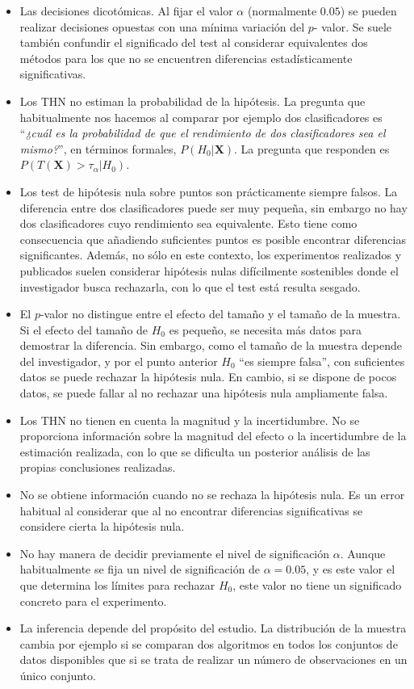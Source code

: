 \begin{itemize}
\item Las decisiones dicotómicas. Al fijar el valor 
	$\alpha$ (normalmente $0.05$) se pueden realizar 
	decisiones opuestas con una mínima variación del $p$-
	valor. Se suele también confundir el significado del 
	test al considerar equivalentes dos métodos para los que
	no se encuentren diferencias estadísticamente 
	significativas.
\item Los THN no estiman la probabilidad
	de la hipótesis. La pregunta que habitualmente nos
	hacemos al comparar por ejemplo dos clasificadores es
	``\textit{¿cuál es la probabilidad de que el rendimiento
	de dos clasificadores sea el mismo?}'', en términos
	formales, $P(H_0 | \mathbf{X})$. La pregunta que
	responden es $P(T(\mathbf{X}) > \tau_\alpha | H_0)$.
\item Los test de hipótesis nula sobre puntos son
	prácticamente siempre falsos. La diferencia entre
	dos clasificadores puede ser muy pequeña, sin embargo
	no hay dos clasificadores cuyo rendimiento sea 
	equivalente. Esto tiene como consecuencia que añadiendo
	suficientes puntos es posible encontrar diferencias
	significantes. Además, no sólo en este contexto, los
	experimentos realizados y publicados suelen considerar
	hipótesis nulas difícilmente sostenibles donde el
	investigador busca rechazarla, con lo que el test está
	resulta sesgado.
\item El $p$-valor no distingue entre el efecto del tamaño
	y el tamaño de la muestra. Si el efecto del tamaño de
	$H_0$ es pequeño, se necesita más datos para demostrar 
	la diferencia. Sin embargo, como el tamaño de la muestra
	depende del investigador, y por el punto anterior $H_0$ 
	``es siempre falsa'', con suficientes datos se puede
	rechazar la hipótesis nula. En cambio, si se dispone 
	de pocos datos, se puede fallar al no rechazar una
	hipótesis nula ampliamente falsa.
\item Los THN no tienen en cuenta la magnitud y la 
	incertidumbre. No se proporciona información sobre la 
	magnitud del efecto o la incertidumbre de la estimación
	realizada, con lo que se dificulta un posterior análisis
	de las propias conclusiones realizadas.
\item No se obtiene información cuando no se rechaza la
	hipótesis nula. Es un error habitual al considerar 
	que al no encontrar diferencias significativas se
	considere cierta la hipótesis nula. 
\item No hay manera de decidir previamente el nivel 
	de significación $\alpha$. Aunque habitualmente se 
	fija un nivel de significación de $\alpha = 0.05$, y es
	este valor el que determina los límites para rechazar 
	$H_0$, este valor no tiene un significado concreto para
	el experimento. 
\item La inferencia depende del propósito del estudio. 
	La distribución de la muestra cambia por ejemplo si
	se comparan dos algoritmos en todos los conjuntos de
	datos disponibles que si se trata de realizar un 
	número de observaciones en un único conjunto.
\end{itemize}
	
